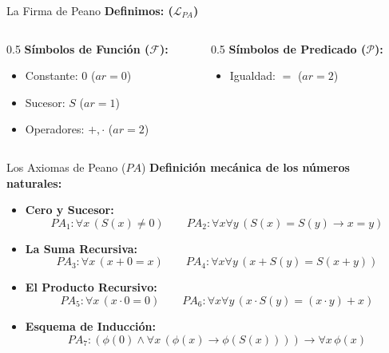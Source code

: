\documentclass[10pt, aspectratio=169]{beamer}
\begin{document}
\begin{frame}{La Firma de Peano}
    \vspace{0.3cm}
    \Large \textbf{Definimos: ($\mathcal{L}_{PA}$)}
    
    \vspace{0.6cm}
    \normalsize
    \begin{columns}
        \begin{column}{0.5\textwidth}
            \alert{\textbf{Símbolos de Función ($\mathcal{F}$):}}
            \large
            \begin{itemize}
                \item Constante: $0$ ($ar=0$)
                \item Sucesor: $S$ ($ar=1$)
                \item Operadores: $+, \cdot$ ($ar=2$)
            \end{itemize}
        \end{column}
        \begin{column}{0.5\textwidth}
            \alert{\textbf{Símbolos de Predicado ($\mathcal{P}$):}}
            \large
            \begin{itemize}
                \item Igualdad: $=$ ($ar=2$)
            \end{itemize}
        \end{column}
    \end{columns}
\end{frame}

\begin{frame}{Los Axiomas de Peano ($PA$)}
    \vspace{0.2cm}
    \small \textbf{Definición mecánica de los números naturales:}

    
    \vspace{0.2cm}
    \footnotesize
    \begin{itemize}
        \setlength\itemsep{0.3cm}
        \item \textbf{Cero y Sucesor:} 
        $$PA_1: \forall x \, (S(x) \neq 0) \quad \quad PA_2: \forall x \forall y \, (S(x) = S(y) \to x = y)$$
        
        \item \textbf{La Suma Recursiva:}
        $$PA_3: \forall x \, (x + 0 = x) \quad \quad PA_4: \forall x \forall y \, (x + S(y) = S(x + y))$$
        
        \item \textbf{El Producto Recursivo:}
        $$PA_5: \forall x \, (x \cdot 0 = 0) \quad \quad PA_6: \forall x \forall y \, (x \cdot S(y) = (x \cdot y) + x)$$
        
        \item \textbf{Esquema de Inducción:}
        $$PA_7: (\phi(0) \land \forall x \, (\phi(x) \to \phi(S(x)))) \to \forall x \, \phi(x)$$
    \end{itemize}
\end{frame}
\end{document}
